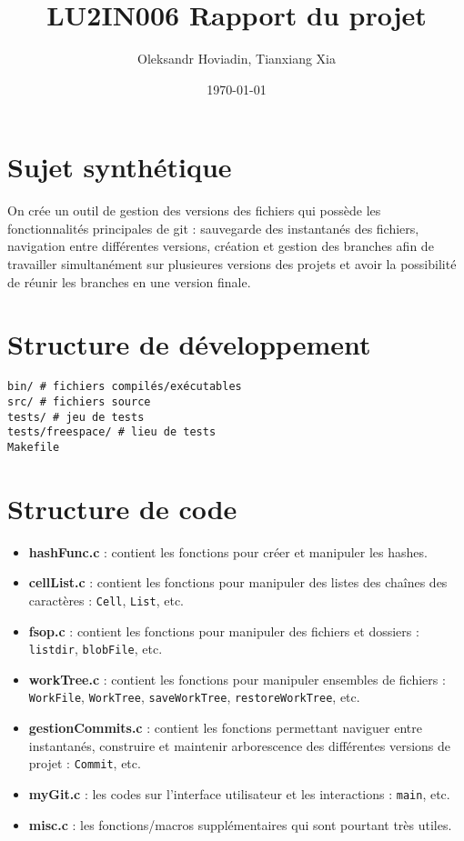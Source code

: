 \documentclass{report}
\title{LU2IN006 Rapport du projet}
\author{Oleksandr Hoviadin, Tianxiang Xia}
\date{\today}
\begin{document}
\maketitle
\section*{Sujet synthétique}
On crée un outil de gestion des versions des fichiers
qui possède les fonctionnalités principales de git : sauvegarde des instantanés
des fichiers, navigation entre différentes versions,
création et gestion des branches afin de travailler simultanément
sur plusieures versions des projets et avoir la possibilité de réunir les branches en une version finale.

\section*{Structure de développement}

\begin{verbatim}
bin/ # fichiers compilés/exécutables
src/ # fichiers source
tests/ # jeu de tests
tests/freespace/ # lieu de tests
Makefile
\end{verbatim}

\section*{Structure de code}
\begin{itemize}
    \item \textbf{hashFunc.c} : contient les fonctions pour créer et manipuler les hashes.
    \item \textbf{cellList.c} : contient les fonctions pour manipuler des listes des chaînes des caractères : \verb|Cell|, \verb|List|, etc.
    \item \textbf{fsop.c} : contient les fonctions pour manipuler des fichiers et dossiers : \verb|listdir|, \verb|blobFile|, etc.
    \item \textbf{workTree.c} : contient les fonctions pour manipuler ensembles de fichiers : \verb|WorkFile|, \verb|WorkTree|, \verb|saveWorkTree|, \verb|restoreWorkTree|, etc.
    \item \textbf{gestionCommits.c} : contient les fonctions permettant naviguer entre instantanés, construire et maintenir arborescence des différentes versions de projet : \verb|Commit|, etc.
    \item\textbf{myGit.c} : les codes sur l'interface utilisateur et les interactions : \verb|main|, etc.
    \item\textbf{misc.c} : les fonctions/macros supplémentaires qui sont pourtant très utiles.
\end{itemize}
\end{document}
